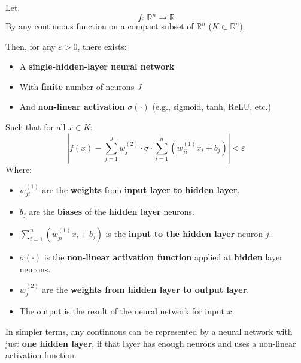 \begin{theorem}
    Let:
    \begin{equation}
        f: \, \mathbb{R}^{n} \rightarrow \mathbb{R}
    \end{equation}
    By any continuous function on a compact subset of $\mathbb{R}^{n}$ ($K \subset \mathbb{R}^{n}$).

    Then, for any $\varepsilon > 0$, there exists:
    \begin{itemize}
        \item A \textbf{single-hidden-layer neural network}
        \item With \textbf{finite} number of neurons $J$
        \item And \textbf{non-linear activation} $\sigma(\cdot)$ (e.g., sigmoid, tanh, ReLU, etc.)
    \end{itemize}
    Such that for all $x \in K$:
    \begin{equation}
        \left|
            f(x) - \displaystyle\sum_{j=1}^{J}
                w_{j}^{(2)} \cdot \sigma \cdot
                    \displaystyle\sum_{i=1}^{n} \left(
                        w_{ji}^{(1)} x_{i} + b_{j}
                    \right)
        \right| < \varepsilon
    \end{equation}
    Where:
    \begin{itemize}
        \item $w_{ji}^{(1)}$ are the \textbf{weights} from \textbf{input layer to hidden layer}.
        \item $b_{j}$ are the \textbf{biases} of the \textbf{hidden layer} neurons.
        \item $\displaystyle\sum_{i=1}^{n} \left( w_{ji}^{(1)} x_{i} + b_{j} \right)$ is the \textbf{input to the hidden layer} neuron $j$.
        \item $\sigma(\cdot)$ is the \textbf{non-linear activation function} applied at \textbf{hidden} layer neurons.
        \item $w_{j}^{(2)}$ are the \textbf{weights from hidden layer to output layer}.
        \item The output is the result of the neural network for input $x$.
    \end{itemize}
\end{theorem}

\noindent
In simpler terms, any continuous can be represented by a neural network with just \textbf{one hidden layer}, if that layer has enough neurons and uses a non-linear activation function.

